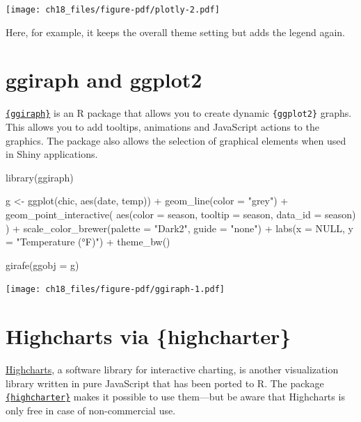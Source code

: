 \documentclass[
  letterpaper,
]{scrbook}
\newenvironment{Shaded}{\begin{snugshade}}{\end{snugshade}}
\newcommand{\AttributeTok}[1]{\textcolor[rgb]{0.40,0.45,0.13}{#1}}
\newcommand{\ConstantTok}[1]{\textcolor[rgb]{0.56,0.35,0.01}{#1}}
\newcommand{\FunctionTok}[1]{\textcolor[rgb]{0.28,0.35,0.67}{#1}}
\newcommand{\NormalTok}[1]{\textcolor[rgb]{0.00,0.23,0.31}{#1}}
\newcommand{\OtherTok}[1]{\textcolor[rgb]{0.00,0.23,0.31}{#1}}
\newcommand{\SpecialCharTok}[1]{\textcolor[rgb]{0.37,0.37,0.37}{#1}}
\newcommand{\StringTok}[1]{\textcolor[rgb]{0.13,0.47,0.30}{#1}}
\begin{document}
\texttt{[image: ch18\_files/figure-pdf/plotly-2.pdf]}

Here, for example, it keeps the overall theme setting but adds the
legend again.

\section{ggiraph and ggplot2}\label{ggiraph-and-ggplot2}

\href{https://davidgohel.github.io/ggiraph/index.html}{\texttt{\{ggiraph\}}}
is an R package that allows you to create dynamic \texttt{\{ggplot2\}}
graphs. This allows you to add tooltips, animations and JavaScript
actions to the graphics. The package also allows the selection of
graphical elements when used in Shiny applications.

\begin{Shaded}
\begin{Highlighting}[]
\FunctionTok{library}\NormalTok{(ggiraph)}

\NormalTok{g }\OtherTok{\textless{}{-}} \FunctionTok{ggplot}\NormalTok{(chic, }\FunctionTok{aes}\NormalTok{(date, temp)) }\SpecialCharTok{+}
  \FunctionTok{geom\_line}\NormalTok{(}\AttributeTok{color =} \StringTok{"grey"}\NormalTok{) }\SpecialCharTok{+}
  \FunctionTok{geom\_point\_interactive}\NormalTok{(}
    \FunctionTok{aes}\NormalTok{(}\AttributeTok{color =}\NormalTok{ season, }\AttributeTok{tooltip =}\NormalTok{ season, }\AttributeTok{data\_id =}\NormalTok{ season)}
\NormalTok{  ) }\SpecialCharTok{+}
  \FunctionTok{scale\_color\_brewer}\NormalTok{(}\AttributeTok{palette =} \StringTok{"Dark2"}\NormalTok{, }\AttributeTok{guide =} \StringTok{"none"}\NormalTok{) }\SpecialCharTok{+}
  \FunctionTok{labs}\NormalTok{(}\AttributeTok{x =} \ConstantTok{NULL}\NormalTok{, }\AttributeTok{y =} \StringTok{"Temperature (°F)"}\NormalTok{) }\SpecialCharTok{+}
  \FunctionTok{theme\_bw}\NormalTok{()}

\FunctionTok{girafe}\NormalTok{(}\AttributeTok{ggobj =}\NormalTok{ g)}
\end{Highlighting}
\end{Shaded}

\texttt{[image: ch18\_files/figure-pdf/ggiraph-1.pdf]}

\section{Highcharts via
\{highcharter\}}\label{highcharts-via-highcharter}

\href{https://www.highcharts.com/}{Highcharts}, a software library for
interactive charting, is another visualization library written in pure
JavaScript that has been ported to R. The package
\href{https://jkunst.com/highcharter/}{\texttt{\{highcharter\}}} makes
it possible to use them---but be aware that Highcharts is only free in
case of non-commercial use.
\end{document}
